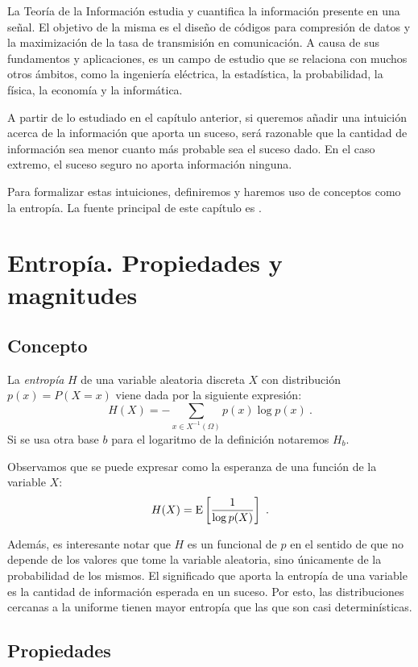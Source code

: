 La Teoría de la Información estudia y cuantifica la información presente
en una señal. El objetivo de la misma es el diseño de códigos para
compresión de datos y la maximización de la tasa de transmisión en
comunicación. A causa de sus fundamentos y aplicaciones, es un campo de
estudio que se relaciona con muchos otros ámbitos, como la ingeniería
eléctrica, la estadística, la probabilidad, la física, la economía y la
informática.

A partir de lo estudiado en el capítulo anterior, si queremos añadir una
intuición acerca de la información que aporta un suceso, será razonable
que la cantidad de información sea menor cuanto más probable sea el
suceso dado. En el caso extremo, el suceso seguro no aporta información
ninguna.

Para formalizar estas intuiciones, definiremos y haremos uso de
conceptos como la entropía. La fuente principal de este capítulo es
\textcite{coverit}.

\section{Entropía. Propiedades y
magnitudes}\label{entropuxeda.-propiedades-y-magnitudes}

\subsection{Concepto}\label{concepto}

La \emph{entropía} \(H\) de una variable aleatoria discreta \(X\) con
distribución \(p(x)=P(X=x)\) viene dada por la siguiente expresión:
\[H(X)=-\sum_{x\in X^{-1}(\Omega)}p(x)\log p(x)~.\] Si se usa otra base
\(b\) para el logaritmo de la definición notaremos \(H_{b}\). 

Observamos que se puede expresar como la esperanza de una función de la
variable \(X\): \[H(X)=\mathrm{E}\left[\frac 1 {\log p(X)}\right]~.\]

Además, es interesante notar que \(H\) es un funcional de \(p\) en el
sentido de que no depende de los valores que tome la variable aleatoria,
sino únicamente de la probabilidad de los mismos. El significado que
aporta la entropía de una variable es la cantidad de información
esperada en un suceso. Por esto, las distribuciones cercanas a la
uniforme tienen mayor entropía que las que son casi determinísticas.

\subsection{Propiedades}\label{propiedades}

